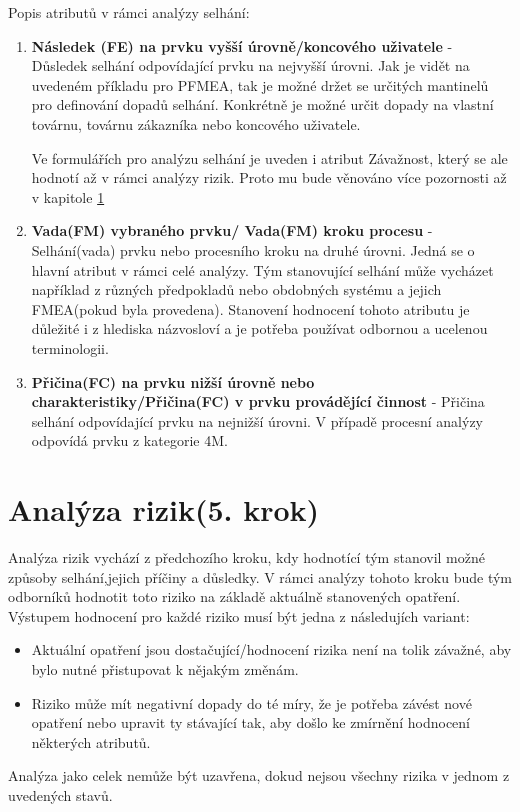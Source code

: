 \clearpage
Popis atributů v rámci analýzy selhání:
\begin{enumerate}
	\item \textbf{Následek (FE) na prvku vyšší úrovně/koncového uživatele } - Důsledek selhání odpovídající prvku na nejvyšší úrovni. Jak je vidět na uvedeném příkladu pro PFMEA, tak je možné držet se určitých mantinelů pro definování dopadů selhání. Konkrétně je možné určit dopady na vlastní továrnu, továrnu zákazníka nebo koncového uživatele. 
 
 Ve formulářích pro analýzu selhání je uveden i atribut Závažnost, který se ale hodnotí až v rámci analýzy rizik. Proto mu bude věnováno více pozornosti až v kapitole \ref{sec:FMEA_postup_5}
	\item \textbf{Vada(FM) vybraného prvku/ Vada(FM) kroku procesu} - Selhání(vada) prvku nebo procesního kroku na druhé úrovni. Jedná se o hlavní atribut v rámci celé analýzy. Tým stanovující  selhání může vycházet například z různých předpokladů nebo obdobných systému a jejich FMEA(pokud byla provedena). Stanovení hodnocení tohoto atributu je důležité i z hlediska názvosloví a je potřeba používat odbornou a ucelenou terminologii.  
	\item \textbf{Přičina(FC) na prvku nižší úrovně nebo charakteristiky/Přičina(FC) v prvku provádějící činnost} - Přičina selhání odpovídající prvku na nejnižší úrovni. V případě procesní analýzy odpovídá prvku z kategorie 4M. 
\end{enumerate}


\section{Analýza rizik(5. krok)}
\label{sec:FMEA_postup_5}
Analýza rizik vychází z předchozího kroku, kdy hodnotící tým stanovil možné způsoby selhání,jejich příčiny a důsledky. V rámci analýzy tohoto kroku bude tým odborníků hodnotit toto riziko na základě aktuálně stanovených opatření. Výstupem hodnocení pro každé riziko musí být jedna z následujích variant:
\begin{itemize}
	\item Aktuální opatření jsou dostačující/hodnocení rizika není na tolik závažné, aby bylo nutné přistupovat k nějakým změnám. 
    \item Riziko může mít negativní dopady do té míry, že je potřeba závést nové opatření nebo upravit ty stávající tak, aby došlo ke zmírnění hodnocení některých atributů.
\end{itemize}
Analýza jako celek nemůže být uzavřena, dokud nejsou všechny rizika v jednom z uvedených stavů.

